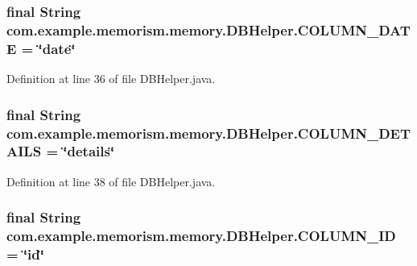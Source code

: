 \subsubsection[{\texorpdfstring{C\+O\+L\+U\+M\+N\+\_\+\+D\+A\+TE}{COLUMN_DATE}}]{\setlength{\rightskip}{0pt plus 5cm}final String com.\+example.\+memorism.\+memory.\+D\+B\+Helper.\+C\+O\+L\+U\+M\+N\+\_\+\+D\+A\+TE = \char`\"{}date\char`\"{}\hspace{0.3cm}{\ttfamily [static]}}\hypertarget{classcom_1_1example_1_1memorism_1_1memory_1_1_d_b_helper_a78ff1252868691cc74b9a20b44849ea5}{}\label{classcom_1_1example_1_1memorism_1_1memory_1_1_d_b_helper_a78ff1252868691cc74b9a20b44849ea5}


Definition at line 36 of file D\+B\+Helper.\+java.

\subsubsection[{\texorpdfstring{C\+O\+L\+U\+M\+N\+\_\+\+D\+E\+T\+A\+I\+LS}{COLUMN_DETAILS}}]{\setlength{\rightskip}{0pt plus 5cm}final String com.\+example.\+memorism.\+memory.\+D\+B\+Helper.\+C\+O\+L\+U\+M\+N\+\_\+\+D\+E\+T\+A\+I\+LS = \char`\"{}details\char`\"{}\hspace{0.3cm}{\ttfamily [static]}}\hypertarget{classcom_1_1example_1_1memorism_1_1memory_1_1_d_b_helper_a43bb30fdefc54ee809ff8517fb0cdbfc}{}\label{classcom_1_1example_1_1memorism_1_1memory_1_1_d_b_helper_a43bb30fdefc54ee809ff8517fb0cdbfc}


Definition at line 38 of file D\+B\+Helper.\+java.

\subsubsection[{\texorpdfstring{C\+O\+L\+U\+M\+N\+\_\+\+ID}{COLUMN_ID}}]{\setlength{\rightskip}{0pt plus 5cm}final String com.\+example.\+memorism.\+memory.\+D\+B\+Helper.\+C\+O\+L\+U\+M\+N\+\_\+\+ID = \char`\"{}id\char`\"{}\hspace{0.3cm}{\ttfamily [static]}}\hypertarget{classcom_1_1example_1_1memorism_1_1memory_1_1_d_b_helper_a12593a1ae6e3c03afbc9d108b7c59dff}{}\label{classcom_1_1example_1_1memorism_1_1memory_1_1_d_b_helper_a12593a1ae6e3c03afbc9d108b7c59dff}


